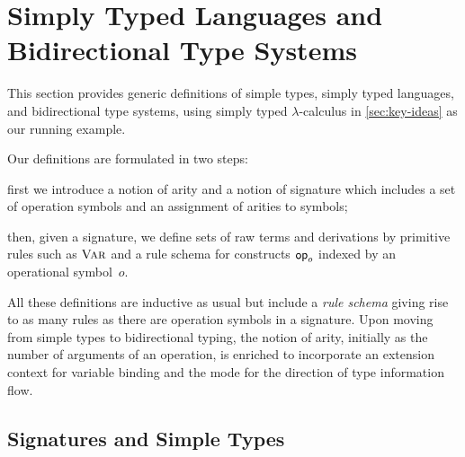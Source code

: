 
\section{Simply Typed Languages and Bidirectional Type Systems}\label{sec:defs}
This section provides generic definitions
of simple types, simply typed languages, and bidirectional type systems, using simply typed $\lambda$-calculus in \cref{sec:key-ideas} as our running example.

Our definitions are formulated in two steps:
\begin{enumerate*}
  \item first we introduce a notion of arity and a notion of signature which includes a set of operation symbols and an assignment of arities to symbols;
\item then, given a signature, we define sets of raw terms and derivations by primitive rules such as $\textnormal{\textsc{Var}}$ and a rule schema for constructs $\mathsf{op}_o$ indexed by an operational symbol~$o$.
\end{enumerate*}
All these definitions are inductive as usual but include a \emph{rule schema} giving rise to as many rules as there are operation symbols in a signature.
Upon moving from simple types to bidirectional typing, the notion of arity, initially as the number of arguments of an operation, is enriched to incorporate an extension context for variable binding and the mode for the direction of type information flow.

\subsection{Signatures and Simple Types} \label{subsec:simple-types}

